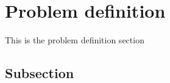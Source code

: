 \section{Problem definition}\label{Section label}
This is the problem definition section
\subsection{Subsection}\label{subsection}